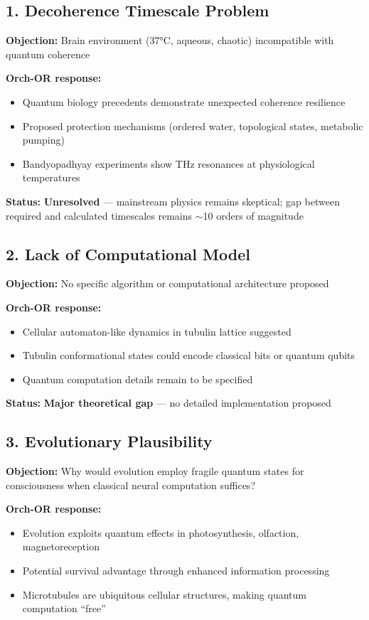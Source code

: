 \subsection{1. Decoherence Timescale Problem}

\textbf{Objection:} Brain environment (37°C, aqueous, chaotic) incompatible with quantum coherence

\textbf{Orch-OR response:}
\begin{itemize}
\item Quantum biology precedents demonstrate unexpected coherence resilience
\item Proposed protection mechanisms (ordered water, topological states, metabolic pumping)
\item Bandyopadhyay experiments show THz resonances at physiological temperatures
\end{itemize}

\textbf{Status:} \textbf{Unresolved} --- mainstream physics remains skeptical; gap between required and calculated timescales remains $\sim$10 orders of magnitude

\subsection{2. Lack of Computational Model}

\textbf{Objection:} No specific algorithm or computational architecture proposed

\textbf{Orch-OR response:}
\begin{itemize}
\item Cellular automaton-like dynamics in tubulin lattice suggested
\item Tubulin conformational states could encode classical bits or quantum qubits
\item Quantum computation details remain to be specified
\end{itemize}

\textbf{Status:} \textbf{Major theoretical gap} --- no detailed implementation proposed

\subsection{3. Evolutionary Plausibility}

\textbf{Objection:} Why would evolution employ fragile quantum states for consciousness when classical neural computation suffices?

\textbf{Orch-OR response:}
\begin{itemize}
\item Evolution exploits quantum effects in photosynthesis, olfaction, magnetoreception
\item Potential survival advantage through enhanced information processing
\item Microtubules are ubiquitous cellular structures, making quantum computation ``free''
\end{itemize}

